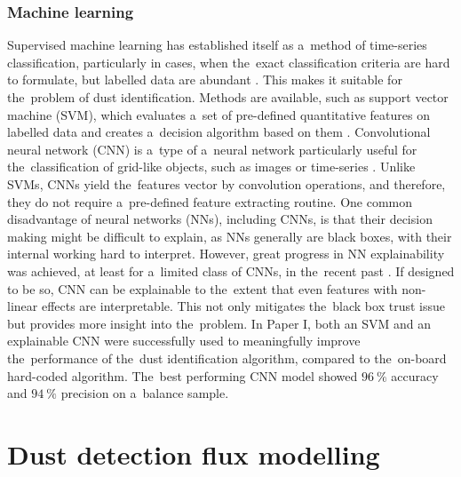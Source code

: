\subsubsection{Machine learning}

Supervised machine learning has established itself as a~method of time-series classification, particularly in cases, when the~exact classification criteria are hard to formulate, but labelled data are abundant \citep{wickstrom2022mixing}. This makes it suitable for the~problem of dust identification. Methods are available, such as support vector machine ({SVM}), which evaluates a~set of pre-defined quantitative features on labelled data and creates a~decision algorithm based on them \citep{vapnik1997support}. Convolutional neural network ({CNN}) is a~type of a~neural network particularly useful for the~classification of grid-like objects, such as images or time-series \citep{gu2018recent}. Unlike SVMs, CNNs yield the~features vector by convolution operations, and therefore, they do not require a~pre-defined feature extracting routine. One common disadvantage of neural networks ({NN}s), including CNNs, is that their decision making might be difficult to explain, as NNs generally are black boxes, with their internal working hard to interpret. However, great progress in NN explainability was achieved, at least for a~limited class of CNNs, in the~recent past \citep{samek2021explaining}. If designed to be so, CNN can be explainable to the~extent that even features with non-linear effects are interpretable. This not only mitigates the~black box trust issue but provides more insight into the~problem. In Paper I, both an SVM and an explainable CNN were successfully used to meaningfully improve the~performance of the~dust identification algorithm, compared to the~on-board hard-coded algorithm. The~best performing CNN model showed $\SI{96}{\%}$ accuracy and $\SI{94}{\%}$ precision on a~balance sample.

\section{Dust detection flux modelling}

